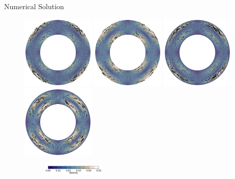\documentclass[10pt,aspectratio=169]{beamer}
\begin{document}
\begin{frame}{Numerical Solution}
	\vspace{-0.32in}
	\begin{figure}[!htb]
		\begin{multicols}{4}
			\includegraphics[width=3.5cm]{./case1/vel_uw.png}\par
			\hspace{0.75in}
			\includegraphics[width=3.5cm]{./case2/vel_uw.png}\par
			\hspace{1.5in}
			\includegraphics[width=3.5cm]{./case3/vel_uw.png}\par
			\hspace{2.25in}
			\includegraphics[width=3.5cm]{./case4/vel_uw.png}
		\end{multicols}
		\vspace{-0.29in}
		\begin{figure}
			\hspace{0.1in} 
			\includegraphics[width=3cm]{./case1/v_ana_cbhorz.pdf}
		\end{figure}
	\end{figure}
	

\end{frame}
\end{document}

